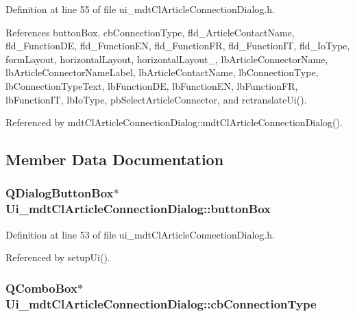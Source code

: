 Definition at line 55 of file ui\-\_\-mdt\-Cl\-Article\-Connection\-Dialog.\-h.



References button\-Box, cb\-Connection\-Type, fld\-\_\-\-Article\-Contact\-Name, fld\-\_\-\-Function\-D\-E, fld\-\_\-\-Function\-E\-N, fld\-\_\-\-Function\-F\-R, fld\-\_\-\-Function\-I\-T, fld\-\_\-\-Io\-Type, form\-Layout, horizontal\-Layout, horizontal\-Layout\-\_, lb\-Article\-Connector\-Name, lb\-Article\-Connector\-Name\-Label, lb\-Article\-Contact\-Name, lb\-Connection\-Type, lb\-Connection\-Type\-Text, lb\-Function\-D\-E, lb\-Function\-E\-N, lb\-Function\-F\-R, lb\-Function\-I\-T, lb\-Io\-Type, pb\-Select\-Article\-Connector, and retranslate\-Ui().



Referenced by mdt\-Cl\-Article\-Connection\-Dialog\-::mdt\-Cl\-Article\-Connection\-Dialog().



\subsection{Member Data Documentation}
\hypertarget{class_ui__mdt_cl_article_connection_dialog_a3276f2d3e88acbf806c566f9c534467f}{
\subsubsection[{button\-Box}]{\setlength{\rightskip}{0pt plus 5cm}Q\-Dialog\-Button\-Box$\ast$ Ui\-\_\-mdt\-Cl\-Article\-Connection\-Dialog\-::button\-Box}}\label{class_ui__mdt_cl_article_connection_dialog_a3276f2d3e88acbf806c566f9c534467f}


Definition at line 53 of file ui\-\_\-mdt\-Cl\-Article\-Connection\-Dialog.\-h.



Referenced by setup\-Ui().

\hypertarget{class_ui__mdt_cl_article_connection_dialog_a58ec113ad5d3de7e47cdd8e2124563ca}{
\subsubsection[{cb\-Connection\-Type}]{\setlength{\rightskip}{0pt plus 5cm}Q\-Combo\-Box$\ast$ Ui\-\_\-mdt\-Cl\-Article\-Connection\-Dialog\-::cb\-Connection\-Type}}\label{class_ui__mdt_cl_article_connection_dialog_a58ec113ad5d3de7e47cdd8e2124563ca}


